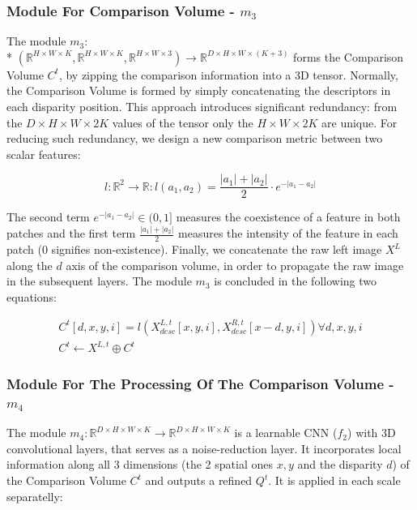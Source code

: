 \documentclass[runningheads]{llncs}
\begin{document}
\subsubsection{Module For Comparison Volume - $m_3$}

The module $m_3:$ \\* $(\mathbb{R}^{H \times W \times K}, \mathbb{R}^{H \times W \times K}, \mathbb{R}^{H \times W \times 3}) \rightarrow \mathbb{R}^{D \times H \times W \times (K+3)}$ forms the Comparison Volume $C^t$, by zipping the comparison information into a 3D tensor. Normally, the Comparison Volume is formed by simply concatenating the descriptors in each disparity position. This approach introduces significant redundancy: from the $D \times H \times W \times 2K$ values of the tensor only the $H \times W \times 2K$ are unique. For reducing such redundancy, we design a new comparison metric between two scalar features:

\begin{equation} \label{eq:m}
    l: \mathbb{R}^2 \rightarrow \mathbb{R}: l(a_1, a_2) = \frac{|a_1| + |a_2|}{2} \cdot e^{-|a_1 - a_2|}    
\end{equation}


The second term $e^{-|a_1 - a_2|} \in (0,1]$ measures the coexistence of a feature in both patches and the first term $\frac{|a_1| + |a_2|}{2}$ measures the intensity of the feature in each patch ($0$ signifies non-existence). Finally, we concatenate the raw left image $X^L$ along the $d$ axis of the comparison volume, in order to propagate the raw image in the subsequent layers. The module $m_3$ is concluded in the following two equations:

\begin{gather} \label{eq:comparison_volume}
    C^t[d, x, y, i] = l( X^{L, t}_{desc}[x,y,i], X^{R, t}_{desc}[x-d,y, i]) \forall d,x,y,i\\
    C^t \leftarrow X^{L, t} \oplus C^t
\end{gather}

\subsubsection{Module For The Processing Of The Comparison Volume - $m_4$} The module $m_4: \mathbb{R}^{D \times H \times W \times K} \rightarrow \mathbb{R}^{D \times H \times W \times K}$ is a learnable CNN ($f_2$) with 3D convolutional layers, that serves as a noise-reduction layer. It incorporates local information along all 3 dimensions (the 2 spatial ones $x,y$ and the disparity $d$) of the Comparison Volume $C^t$ and outputs a refined $Q^t$. It is applied in each scale separatelly:
\end{document}
